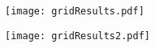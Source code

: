 \begin{slide}
\texttt{[image: gridResults.pdf]}
\end{slide}

\begin{slide}
\texttt{[image: gridResults2.pdf]}
\end{slide}
